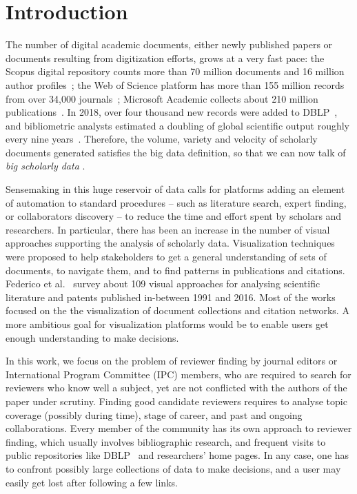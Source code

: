 \chapter{Introduction}\label{sec:introduction}
The number of digital academic documents, either newly published papers or documents resulting from digitization efforts, grows at a very fast pace: the Scopus digital repository counts more than 70 million documents and 16 million author profiles~\cite{scopus}; the Web of Science platform has more than 155 million records from over 34,000 journals~\cite{WoS}; Microsoft Academic collects about 210 million publications~\cite{MA}. In 2018, over four thousand new records were added to DBLP~\cite{DBLPrate}, and bibliometric analysts estimated a doubling of global scientific output roughly every nine years~\cite{BoMu15}. Therefore, the volume, variety and velocity of scholarly documents generated satisfies the big data definition, so that we can now talk of \emph{big scholarly data} \cite{KhLi17}. 

Sensemaking in this huge reservoir of data calls for platforms adding an element of automation to standard procedures -- such as literature search, expert finding, or collaborators discovery -- to reduce the time and effort spent by scholars and researchers. In particular, there has been an increase in the number of visual approaches supporting the analysis of scholarly data. Visualization techniques were proposed to help stakeholders to get a general understanding of sets of documents, to navigate them, and to find patterns in publications and citations. Federico et al.~\cite{FeHe17} survey about 109 visual approaches for analysing scientific literature and patents published in-between 1991 and 2016. Most of the works focused on the the visualization of document collections and citation networks. A more ambitious goal for visualization platforms would be to enable users get enough understanding to make decisions. 

In this work, we focus on the problem of reviewer finding by journal editors or International Program Committee (IPC) members, who are required to search for reviewers who know well a subject, yet are not conflicted with the authors of the paper under scrutiny. Finding good candidate reviewers requires to analyse topic coverage (possibly during time), stage of career, and past and ongoing collaborations. Every member of the community has its own approach to reviewer finding, which usually involves bibliographic research, and frequent visits to public repositories like DBLP~\cite{ley2002dblp} and researchers' home pages. In any case, one has to confront possibly large collections of data to make decisions, and a user may easily get lost after following a few links.  

